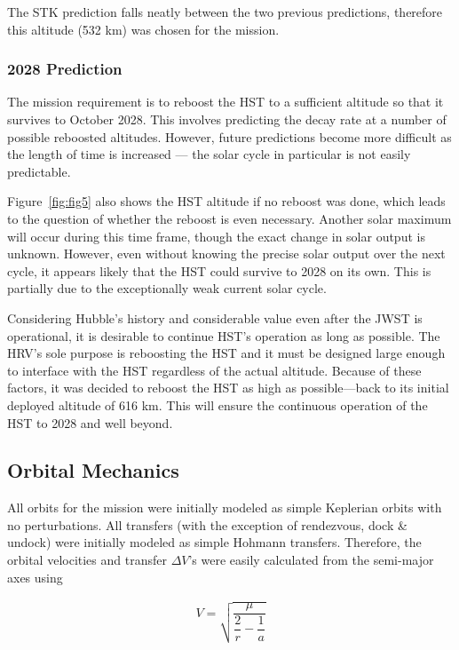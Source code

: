 \documentclass[paper=letter, fontsize=11pt]{scrartcl} %
\numberwithin{equation}{section} %
\numberwithin{figure}{section} %
\numberwithin{table}{section} %
\begin{document}
The STK prediction falls neatly between the two previous predictions, therefore this altitude (532 km) was chosen for the mission.


\subsubsection{2028 Prediction}

The mission requirement is to reboost the HST to a sufficient altitude so that it survives to October 2028. This involves predicting the decay rate at a number of possible reboosted altitudes. However, future predictions become more difficult as the length of time is increased --- the solar cycle in particular is not easily predictable.

Figure~\ref{fig:fig5} also shows the HST altitude if no reboost was done, which leads to the question of whether the reboost is even necessary. Another solar maximum will occur during this time frame, though the exact change in solar output is unknown. However, even without knowing the precise solar output over the next cycle, it appears likely that the HST could survive to 2028 on its own. This is partially due to the exceptionally weak current solar cycle.

Considering Hubble's history and considerable value even after the JWST is operational, it is desirable to continue HST's operation as long as possible. The HRV's sole purpose is reboosting the HST and it must be designed large enough to interface with the HST regardless of the actual altitude. Because of these factors, it was decided to reboost the HST as high as possible---back to its initial deployed altitude of 616 km. This will ensure the continuous operation of the HST to 2028 and well beyond.

\subsection{Orbital Mechanics}

All orbits for the mission were initially modeled as simple Keplerian orbits with no perturbations. All transfers (with the exception of rendezvous, dock \& undock) were initially modeled as simple Hohmann transfers. Therefore, the orbital velocities and transfer $\Delta V$'s were easily calculated from the semi-major axes using

\begin{align*}
V = \sqrt{\dfrac{\mu}{\dfrac{2}{r}-\dfrac{1}{a}}}
\end{align*}
\end{document}
